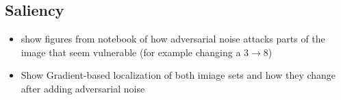 \subsection{Saliency}
\begin{itemize}
    \item show figures from notebook of how adversarial noise attacks parts of the image that seem vulnerable (for example changing a 3$\to$8)
    \item Show Gradient-based localization of both imiage sets and how they change after adding adversarial noise\cite{Selvaraju_2019}
\end{itemize}
